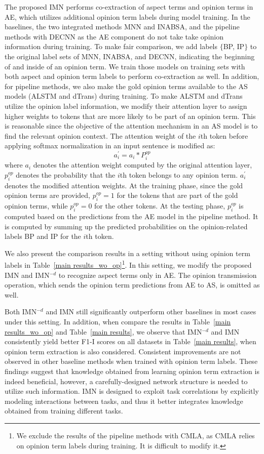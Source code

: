 \documentclass[11pt,a4paper]{article}
\begin{document}
The proposed IMN performs co-extraction of aspect terms and opinion terms in AE, which utilizes additional opinion term labels during model training. In the baselines, the two integrated methods MNN and INABSA, and the pipeline methods with DECNN as the AE component do not take take opinion information during training. To make fair comparison, we add labels $\{$BP, IP$\}$ to the original label sets of MNN, INABSA, and DECNN, indicating the beginning of and inside of an opinion term. We train those models on training sets with both aspect and opinion term labels to perform co-extraction as well. In addition, for pipeline methods, we also make the gold opinion terms available to the AS models (ALSTM and dTrans) during training. To make ALSTM and dTrans utilize the opinion label information, we modify their attention layer to assign higher weights to tokens that are more likely to be part of an opinion term. This is reasonable since the objective of the attention mechanism in an AS model is to find the relevant opinion context.  The attention weight of the $i$th token before applying softmax normalization in an input sentence is modified as:
\begin{equation}
    a_i^{\prime} = a_i * P_i^{op} 
\end{equation}
where $a_i$ denotes the attention weight computed by the original attention layer, $p_i^{op}$ denotes the probability that the $i$th token belongs to any opinion term. $a_i^{\prime}$ denotes the modified attention weights. At the training phase, since the gold opinion terms are provided, $p_i^{op}=1$ for the tokens that are part of the gold opinion terms, while $p_i^{op}=0$ for the other tokens. At the testing phase, $p_i^{op}$ is computed based on the predictions from the AE model in the pipeline method. It is computed by summing up the predicted probabilities on the opinion-related labels BP and IP for the $i$th token.

We also present the comparison results in a setting without using opinion term labels in Table~\ref{main results_wo_op}\footnote{We exclude the results of the pipeline methods with CMLA, as CMLA relies on opinion term labels during training. It is difficult to modify it.}. In this setting, we modify the proposed IMN and IMN$^{-d}$ to recognize aspect terms only in AE. The opinion transmission operation, which sends the opinion term predictions from AE to AS, is omitted as well. 

Both IMN$^{-d}$ and IMN still significantly outperform other baselines in most cases under this setting. In addition, when compare the results in Table~\ref{main results_wo_op} and Table~\ref{main results}, we observe that IMN$^{-d}$ and IMN consistently yield better F1-I scores on all datasets in Table~\ref{main results}, when opinion term extraction is also considered. Consistent improvements are not observed in other baseline methods when trained with opinion term labels. These findings suggest that knowledge obtained from learning opinion term extraction is indeed beneficial, however, a carefully-designed network structure is needed to utilize such information. IMN is designed to exploit task correlations by explicitly modeling interactions between tasks, and thus it better integrates knowledge obtained from training different tasks. 
\end{document}
